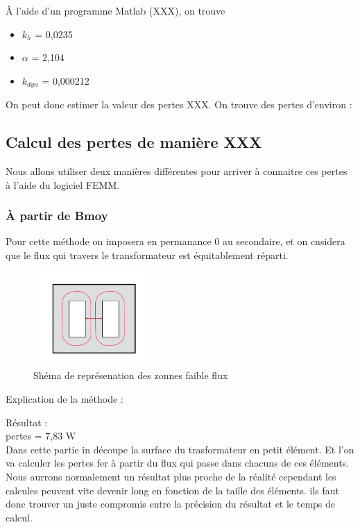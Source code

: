 À l'aide d'un programme Matlab (XXX), on trouve 
\begin{itemize}
\item  $k_h$   = 0,0235
\item $\alpha$ = 2,104
\item $k_{dyn}$ = 0,000212
\end{itemize}

On peut donc estimer la valeur des pertes XXX. On trouve des pertes d'environ : 



\subsection{Calcul des pertes de manière XXX}

Nous allons utiliser deux manières différentes pour arriver à connaitre ces pertes à l'aide du logiciel FEMM.

\subsubsection{À partir de Bmoy}

	Pour cette méthode on imposera en permanance 0 au secondaire, et on cnsidera que le flux qui travers le transformateur est équitablement réparti. \\

\begin{figure}[ht]
	\begin{center}
	\includegraphics[width=0.4\textwidth]{images/TP3_repartission_Bmoy}
	\caption{Shéma de représenation des zonnes faible flux}\label{img:RepChampsBmoy}
	\end{center}
\end{figure}
\FloatBarrier

Explication de la méthode : 


Résultat : \\
pertes = 7,83 W\\

	Dans cette partie in découpe la surface du trasformateur en petit élément. Et l'on va calculer les pertes fer à partir du flux qui passe dans chacuns de ces éléments.
 Nous aurrons normalement un résultat plus proche de la réalité cependant les calcules peuvent vite devenir long en fonction de la taille des éléments. ils faut donc trouver un juste compromis entre la précision du résultat et le temps de calcul. 


